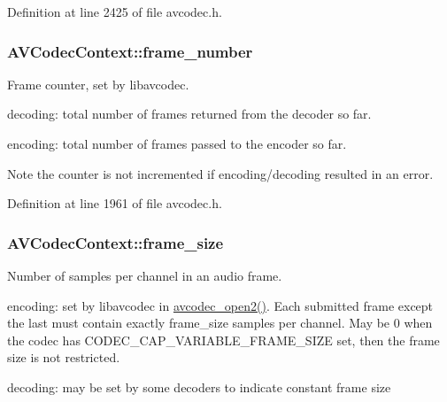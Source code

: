 Definition at line 2425 of file avcodec.\+h.

\subsubsection[{\texorpdfstring{frame\+\_\+number}{frame_number}}]{ A\+V\+Codec\+Context\+::frame\+\_\+number}\hypertarget{struct_a_v_codec_context_a9e5a25a530d01c04491216c368a1a04a}{}\label{struct_a_v_codec_context_a9e5a25a530d01c04491216c368a1a04a}
Frame counter, set by libavcodec.


\begin{DoxyItemize}
\item decoding\+: total number of frames returned from the decoder so far.
\item encoding\+: total number of frames passed to the encoder so far.

\begin{DoxyNote}{Note}
the counter is not incremented if encoding/decoding resulted in an error. 
\end{DoxyNote}

\end{DoxyItemize}

Definition at line 1961 of file avcodec.\+h.

\subsubsection[{\texorpdfstring{frame\+\_\+size}{frame_size}}]{ A\+V\+Codec\+Context\+::frame\+\_\+size}\hypertarget{struct_a_v_codec_context_aec57f0d859a6df8b479cd93ca3a44a33}{}\label{struct_a_v_codec_context_aec57f0d859a6df8b479cd93ca3a44a33}
Number of samples per channel in an audio frame.


\begin{DoxyItemize}
\item encoding\+: set by libavcodec in \hyperlink{group__lavc__core_ga11f785a188d7d9df71621001465b0f1d}{avcodec\+\_\+open2()}. Each submitted frame except the last must contain exactly frame\+\_\+size samples per channel. May be 0 when the codec has C\+O\+D\+E\+C\+\_\+\+C\+A\+P\+\_\+\+V\+A\+R\+I\+A\+B\+L\+E\+\_\+\+F\+R\+A\+M\+E\+\_\+\+S\+I\+ZE set, then the frame size is not restricted.
\item decoding\+: may be set by some decoders to indicate constant frame size 
\end{DoxyItemize}

